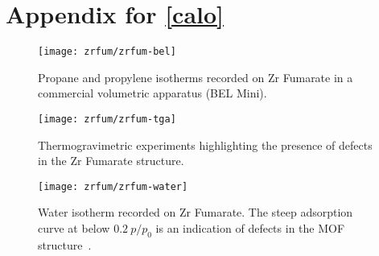 
\graphicspath{ {\thisch/figures/} }

\chapter{Appendix for \autoref{calo}}%
\label{appx:calo}

\begin{figure}[H]
    \centering
    \texttt{[image: zrfum/zrfum-bel]}
    \caption{
        Propane and propylene isotherms recorded on Zr Fumarate
        in a commercial volumetric apparatus (BEL Mini). 
    }\label{appx:calo:fgr:zrfum-bel}
\end{figure}

\begin{figure}[H]
    \centering
    \texttt{[image: zrfum/zrfum-tga]}
    \caption{
        Thermogravimetric experiments highlighting the
        presence of defects in the Zr Fumarate structure.
    }\label{appx:calo:fgr:zrfum-tga}
\end{figure}

\begin{figure}[H]
    \centering
    \texttt{[image: zrfum/zrfum-water]}
    \caption{
        Water isotherm recorded on Zr Fumarate. The 
        steep adsorption curve at below \(0.2~p/p_0\) is an 
        indication of defects in the MOF 
        structure~\cite{choiRoleStructuralDefects2018}.
    }\label{appx:calo:fgr:zrfum-water}
\end{figure}

\FloatBarrier{}
\pagebreak


